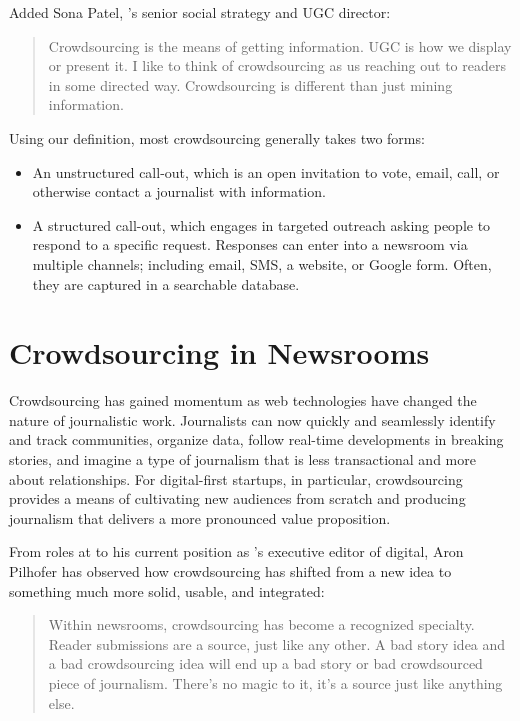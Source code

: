 \begin{itemize}
Added Sona Patel, ’s senior social strategy and UGC director: 

\begin{quote}Crowdsourcing is the means of getting information. UGC is how we display or present it. I like to think of crowdsourcing as us reaching out to readers in some directed way. Crowdsourcing is different than just mining information.\autocite{Patel}\end{quote}

Using our definition, most crowdsourcing generally takes two forms:
\begin{itemize}
\item An unstructured call-out, which is an open invitation to vote, email, call, or otherwise contact a journalist with information.
\item A structured call-out, which engages in targeted outreach asking people to respond to a specific request. Responses can enter into a newsroom via multiple channels; including email, SMS, a website, or Google form. Often, they are captured in a searchable database.
\end{itemize}
\chapter{Crowdsourcing in Newsrooms}	

Crowdsourcing has gained momentum as web technologies have changed the nature of journalistic work. Journalists can now quickly and seamlessly identify and track communities, organize data, follow real-time developments in breaking stories, and imagine a type of journalism that is less transactional and more about relationships. For digital-first startups, in particular, crowdsourcing provides a means of cultivating new audiences from scratch and producing journalism that delivers a more pronounced value proposition. 

From roles at  to his current position as ’s executive editor of digital, Aron Pilhofer has observed how crowdsourcing has shifted from a new idea to something much more solid, usable, and integrated: 
\begin{quote}
Within newsrooms, crowdsourcing has become a recognized specialty. Reader submissions are a source, just like any other. A bad story idea and a bad crowdsourcing idea will end up a bad story or bad crowdsourced piece of journalism. There’s no magic to it, it’s a source just like anything else.\autocite{Pilhofer}
\end{quote}


\end{itemize}
